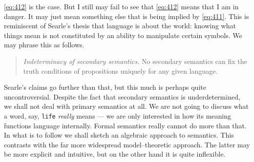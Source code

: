 \eqref{eq:412} is the case. But I still may fail to see that
\eqref{eq:412} means that I am in danger. It may just mean
something else that is being implied by \eqref{eq:411}.
This is reminiscent of Searle's thesis that language is about
the world: knowing what things mean is not constituted by an
ability to manipulate certain symbols. We may phrase this as
follows.
\begin{quote}
{\sl Indeterminacy of secondary semantics.} No secondary
semantics can fix the truth conditions of propositions uniquely
for any given language.
\end{quote}
Searle's claims go further than that, but this much is perhaps
quite uncontroversial. Despite the fact that secondary semantics
is underdetermined, we shall not deal with primary semantics at
all. We are not going to discuss what a word, say, {\tt life} {\it
really\/} means --- we are only interested in how its meaning
functions language internally. Formal semantics really cannot do
more than that.
\nocite{zimmermann:meaning}
In what is to follow we shall sketch an algebraic approach to
semantics. This contrasts with the far more widespread
model--theoretic approach. The latter may be more explicit
and intuitive, but on the other hand it is quite
inflexible.

